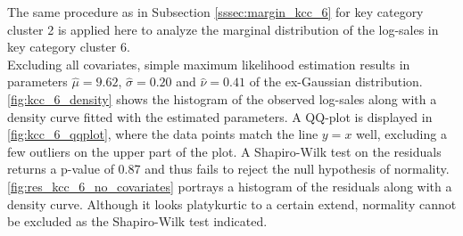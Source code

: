 
The same procedure as in Subsection \ref{sssec:margin_kcc_6} for key category cluster 2 is applied here to analyze the marginal distribution of the log-sales in key category cluster 6.\\

Excluding all covariates, simple maximum likelihood estimation results in parameters $\hat{\mu} = 9.62$, $\hat{\sigma} = 0.20$ and $\hat{\nu} = 0.41$ of the ex-Gaussian distribution.
\autoref{fig:kcc_6_density} shows the histogram of the observed log-sales along with a density curve fitted with the estimated parameters. A QQ-plot is displayed in \autoref{fig:kcc_6_qqplot}, where the data points match the line $y=x$ well, excluding a few outliers on the upper part of the plot.
 A Shapiro-Wilk test on the residuals returns a p-value of 0.87 and thus fails to reject the null hypothesis of normality. \autoref{fig:res_kcc_6_no_covariates} portrays a histogram of the residuals along with a density curve. Although it looks platykurtic to a certain extend, normality cannot be excluded as the Shapiro-Wilk test indicated.
\\


%



